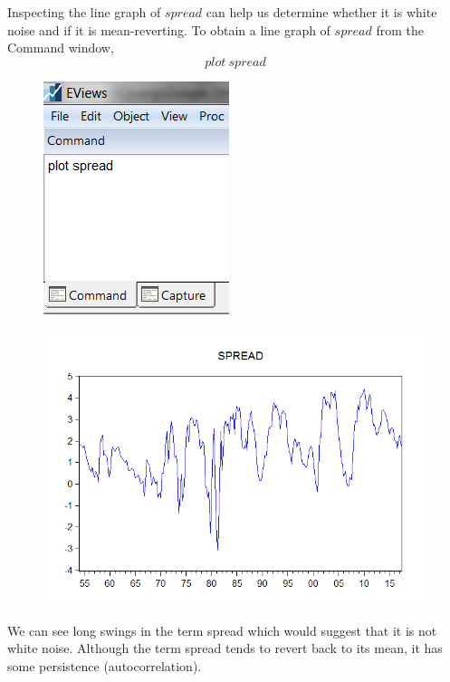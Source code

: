 \documentclass[12pt]{report}
\begin{document}
\noindent Inspecting the line graph of $spread$ can help us determine whether it is white noise and if it is mean-reverting. To obtain a line graph of $spread$ from the Command window, $$plot\ spread$$
\begin{figure}[H]
	\centerline{\includegraphics{tute11_36}}
\end{figure}
\vspace{-\baselineskip}
\begin{figure}[H]
	\centerline{\includegraphics{tute11_37}}
\end{figure}
\vspace{-\baselineskip} \noindent We can see long swings in the term spread which would suggest that it is not white noise. Although the term spread tends to revert back to its mean, it has some persistence (autocorrelation).
\end{document}
